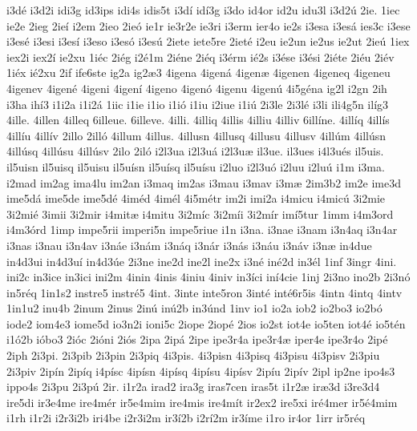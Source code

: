{i3d^^e9
i3d2i
idi3g
id3ips
idi4s
idis5t
i3d^^ed
id^^ed3g
i3do
id4or
id2u
idu3l
i3d2^^fa
2ie.
1iec
ie2e
2ieg
2ie^^ed
i2em
2ieo
2ie^^f3
ie1r
ie3r2e
ie3ri
i3erm
ier4o
ie2s
i3esa
i3es^^e1
ies3c
i3ese
i3es^^e9
i3esi
i3es^^ed
i3eso
i3es^^f3
i3es^^fa
2iete
iete5re
2iet^^e9
i2eu
ie2un
ie2us
ie2ut
2ie^^fa
1iex
iex2i
iex2^^ed
ie2xu
1i^^e9c
2i^^e9g
i2^^e91m
2i^^e9ne
2i^^e9q
i3^^e9rm
i^^e92s
i3^^e9se
i3^^e9si
2i^^e9te
2i^^e9u
2i^^e9v
1i^^e9x
i^^e92xu
2if
ife6ste
ig2a
ig2^^e63
4igena
4igen^^e1
4igen^^e6
4igenen
4igeneq
4igeneu
4igenev
4igen^^e9
4igeni
4igen^^ed
4igeno
4igen^^f3
4igenu
4igen^^fa
4i5g^^e9na
ig2l
i2gn
2ih
i3ha
ih^^ed3
i1i2a
i1i2^^e1
1iic
i1ie
i1io
i1i^^f3
i1iu
i2iue
i1i^^fa
2i3le
2i3l^^e9
i3li
ili4g5n
il^^edg3
4ille.
4illen
4illeq
6illeue.
6illeve.
4illi.
4illiq
4illis
4illiu
4illiv
6ill^^edne.
4ill^^edq
4ill^^eds
4ill^^edu
4ill^^edv
2illo
2ill^^f3
4illum
4illus.
4illusn
4illusq
4illusu
4illusv
4ill^^fam
4ill^^fasn
4ill^^fasq
4ill^^fasu
4ill^^fasv
2ilo
2il^^f3
i2l3ua
i2l3u^^e1
i2l3u^^e6
il3ue.
il3ues
i4l3u^^e9s
il5uis.
il5uisn
il5uisq
il5uisu
il5u^^edsn
il5u^^edsq
il5u^^edsu
i2luo
i2l3u^^f3
i2luu
i2lu^^fa
i1m
i3ma.
i2mad
im2ag
ima4lu
im2an
i3maq
im2as
i3mau
i3mav
i3m^^e6
2im3b2
im2e
ime3d
ime5d^^e1
ime5de
ime5d^^e9
4im^^e9d
4im^^e9l
4i5m^^e9tr
im2i
imi2a
i4micu
i4mic^^fa
3i2mie
3i2mi^^e9
3imii
3i2mir
i4mit^^e6
i4mitu
3i2m^^edc
3i2m^^edi
3i2m^^edr
im^^ed5tur
1imm
i4m3ord
i4m3^^f3rd
1imp
impe5rii
imperi5n
impe5riue
i1n
i3na.
i3nae
i3nam
i3n4aq
i3n4ar
i3nas
i3nau
i3n4av
i3n^^e1e
i3n^^e1m
i3n^^e1q
i3n^^e1r
i3n^^e1s
i3n^^e1u
i3n^^e1v
i3n^^e6
in4due
in4d3ui
in4d3u^^ed
in4d3^^fae
2i3ne
ine2d
ine2l
ine2x
i3n^^e9
in^^e92d
in3^^e9l
1inf
3ingr
4ini.
ini2c
in3ice
in3ici
ini2m
4inin
4inis
4iniu
4iniv
in3^^edci
in^^ed4cie
1inj
2i3no
ino2b
2i3n^^f3
in5r^^e9q
1in1s2
instre5
instr^^e95
4int.
3inte
inte5ron
3int^^e9
int^^e96r5is
4intn
4intq
4intv
1in1u2
inu4b
2inum
2inus
2in^^fa
in^^fa2b
in3^^fand
1inv
io1
io2a
iob2
io2bo3
io2b^^f3
iode2
iom4e3
iome5d
io3n2i
ioni5c
2iope
2iop^^e9
2ios
io2st
iot4e
io5ten
iot4^^e9
io5t^^e9n
i1^^f32b
i^^f3bo3
2i^^f3c
2i^^f3ni
2i^^f3s
2ipa
2ip^^e1
2ipe
ipe3r4a
ipe3r4^^e6
iper4e
ipe3r4o
2ip^^e9
2iph
2i3pi.
2i3pib
2i3pin
2i3piq
4i3pis.
4i3pisn
4i3pisq
4i3pisu
4i3pisv
2i3piu
2i3piv
2ip^^edn
2ip^^edq
i4p^^edsc
4ip^^edsn
4ip^^edsq
4ip^^edsu
4ip^^edsv
2ip^^edu
2ip^^edv
2ipl
ip2ne
ipo4s3
ippo4s
2i3pu
2i3p^^fa
2ir.
i1r2a
irad2
ira3g
iras7cen
iras5t
i1r2^^e6
ir^^e63d
i3re3d4
ire5di
ir3e4me
ire4m^^e9r
ir5e4mim
ire4mis
ire4m^^edt
ir2ex2
ire5xi
ir^^e94mer
ir5^^e94mim
i1rh
i1r2i
i2r3i2b
iri4be
i2r3i2m
ir3^^ed2b
i2r^^ed2m
ir3^^edme
i1ro
ir4or
1irr
ir5r^^e9q
}
